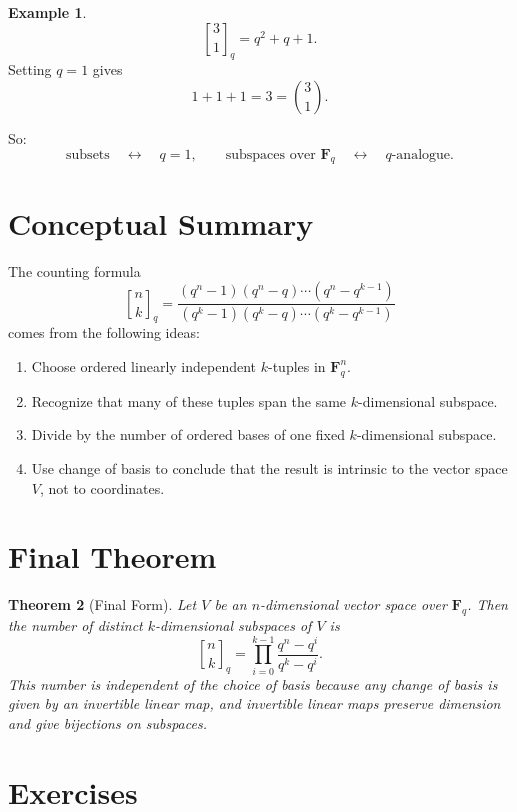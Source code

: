 \documentclass[11pt]{article}
\newtheorem{theorem}{Theorem}[section]
\theoremstyle{definition}
\newtheorem{example}[theorem]{Example}
\theoremstyle{remark}
\newcommand{\F}{\mathbf{F}}
\newcommand{\qbinom}[2]{\genfrac{[}{]}{0pt}{}{#1}{#2}_q}
\begin{document}
	\begin{example}
		\[
		\qbinom{3}{1}=q^2+q+1.
		\]
		Setting \(q=1\) gives
		\[
		1+1+1=3=\binom{3}{1}.
		\]
	\end{example}
	
	So:
	\[
	\text{subsets} \quad \leftrightarrow \quad q=1,
	\qquad
	\text{subspaces over }\F_q \quad \leftrightarrow \quad q\text{-analogue}.
	\]
	
	\section{Conceptual Summary}
	
	The counting formula
	\[
	\qbinom{n}{k}
	=
	\frac{(q^n-1)(q^n-q)\cdots(q^n-q^{k-1})}
	{(q^k-1)(q^k-q)\cdots(q^k-q^{k-1})}
	\]
	comes from the following ideas:
	
	\begin{enumerate}[label=\arabic*.]
		\item Choose ordered linearly independent \(k\)-tuples in \(\F_q^n\).
		\item Recognize that many of these tuples span the same \(k\)-dimensional subspace.
		\item Divide by the number of ordered bases of one fixed \(k\)-dimensional subspace.
		\item Use change of basis to conclude that the result is intrinsic to the vector space \(V\), not to coordinates.
	\end{enumerate}
	
	\section{Final Theorem}
	
	\begin{theorem}[Final Form]
		Let \(V\) be an \(n\)-dimensional vector space over \(\F_q\). Then the number of distinct \(k\)-dimensional subspaces of \(V\) is
		\[
		\boxed{
			\qbinom{n}{k}
			=
			\prod_{i=0}^{k-1}\frac{q^n-q^i}{q^k-q^i}
		}.
		\]
		This number is independent of the choice of basis because any change of basis is given by an invertible linear map, and invertible linear maps preserve dimension and give bijections on subspaces.
	\end{theorem}
	
	\section{Exercises}
	
\end{document}
